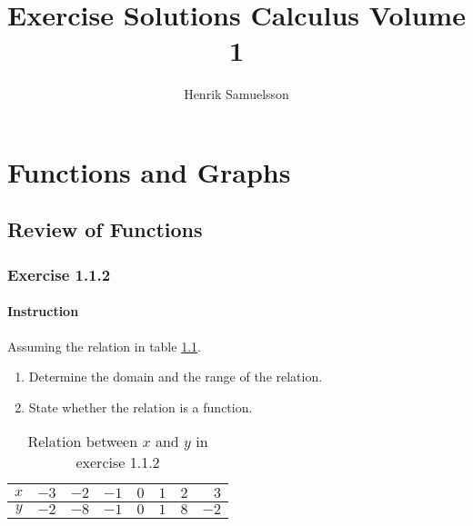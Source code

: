 \documentclass[11pt, letterpaper, oneside]{memoir}
\title{Exercise Solutions Calculus Volume 1}
\author{Henrik Samuelsson}
\date{ }
\begin{document}
\maketitle

\newpage

\tableofcontents

\chapter{Functions and Graphs}

\section{Review of Functions}










\subsection*{Exercise 1.1.2}

\subsubsection{Instruction}

Assuming the relation in table \ref{table:exercise-1.1.2}.
\begin{enumerate}[label=(\alph*)]
  \item Determine the domain and the range of the relation.
  \item State whether the relation is a function.
\end{enumerate}

\begin{table}[ht]
  \centering
  \begin{tabular}{ c | r r r r r r r }
    \hline
    $ x $ & $ -3 $ & $ -2 $ & $ -1 $ & $ 0 $ & $ 1 $ & $ 2 $ & $ 3 $ \\
    \hline
    $ y $ & $ -2 $ & $ -8 $ & $ -1 $ & $ 0 $ & $ 1 $ & $ 8 $ & $ -2 $ \\
    \hline
  \end{tabular}
  \caption{Relation between $ x $ and $ y $ in exercise 1.1.2}
  \label{table:exercise-1.1.2}
\end{table}
\end{document}

